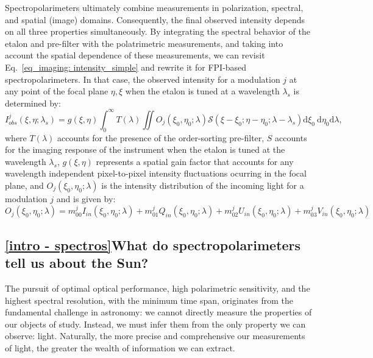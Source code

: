 Spectropolarimeters ultimately combine measurements in polarization, spectral, and spatial (image) domains. Consequently, the final observed intensity depends on all three properties simultaneously. By integrating the spectral behavior of the etalon and pre-filter with the polatrimetric measurements, and taking into account the spatial dependence of these measurements, we can revisit Eq.~\eqref{eq_imaging: intensity_simple} and rewrite it for FPI-based spectropolarimeters. In that case, the observed intensity for a modulation $j$ at any point of the focal plane $\eta, \xi$ when the etalon is tuned at a wavelength $\lambda _ s$ is determined by:
\begin{equation}
  I_{obs}^j\left(\xi, \eta ; \lambda_{s}\right)=g(\xi, \eta)\int_{0}^{\infty} T(\lambda) \iint  O _ j\left(\xi_0, \eta_0 ; \lambda\right)  \mathcal{S}\left(\xi-\xi_0; \eta-\eta_0; \lambda - \lambda_s\right)  \mathrm{d} \xi_{0} \mathrm{~d} \eta_{0}\mathrm{d} \lambda ,
  \label{eq_spectro: General_Intensity}
\end{equation}
where $T(\lambda)$ accounts for the presence of the order-sorting pre-filter, $S$ accounts for the imaging response of the instrument when the etalon is tuned at the wavelength $\lambda_{s}$, $g(\xi, \eta)$ represents a spatial gain factor that accounts for any wavelength independent pixel-to-pixel intensity fluctuations ocurring in the focal plane, and $O _ j(\xi_0, \eta_ 0;\lambda)$ is the intensity distribution of the incoming light for a modulation $j$ and is given by:
\begin{equation}
  O _ j(\xi_0, \eta_ 0;\lambda) = m_{00} ^jI_{in}(\xi_0, \eta_ 0;\lambda) + m_{01}^jQ_{in}(\xi_0, \eta_ 0;\lambda) + m_{02}^jU_{in}(\xi_0, \eta_ 0;\lambda) + m_{03}^jV_{in}(\xi_0, \eta_ 0;\lambda)
\end{equation}
 
\subsection{\ref{intro - spectros}What do spectropolarimeters tell us about the Sun?}

The pursuit of optimal optical performance, high polarimetric sensitivity, and the highest spectral resolution, with the minimum time span, originates from the fundamental challenge in astronomy: we cannot directly measure the properties of our objects of study. Instead, we must infer them from the only property we can observe: light. Naturally, the more precise and comprehensive our measurements of light, the greater the wealth of information we can extract. 

